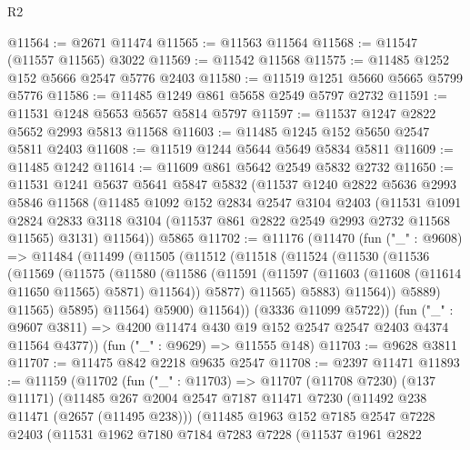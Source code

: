 \begin{lexlean}{R2}
\begin{coremodule}
@11564 := @2671 @11474
@11565 := @11563 @11564
@11568 := @11547 (@11557 @11565) @3022
@11569 := @11542 @11568
@11575 := @11485 @1252 @152 @5666 @2547 @5776 @2403
@11580 := @11519 @1251 @5660 @5665 @5799 @5776
@11586 := @11485 @1249 @861 @5658 @2549 @5797 @2732
@11591 := @11531 @1248 @5653 @5657 @5814 @5797
@11597 := @11537 @1247 @2822 @5652 @2993 @5813 @11568
@11603 := @11485 @1245 @152 @5650 @2547 @5811 @2403
@11608 := @11519 @1244 @5644 @5649 @5834 @5811
@11609 := @11485 @1242
@11614 := @11609 @861 @5642 @2549 @5832 @2732
@11650 := @11531
    @1241
    @5637
    @5641
    @5847
    @5832
    (@11537
      @1240
      @2822
      @5636
      @2993
      @5846
      @11568
      (@11485
        @1092
        @152
        @2834
        @2547
        @3104
        @2403
        (@11531
          @1091
          @2824
          @2833
          @3118
          @3104
          (@11537 @861 @2822 @2549 @2993 @2732 @11568 @11565)
          @3131)
        @11564))
    @5865
@11702 := @11176
    (@11470
      (fun ("_" : @9608) =>
      @11484
        (@11499
          (@11505
            (@11512
              (@11518
                (@11524
                  (@11530
                    (@11536
                      (@11569
                        (@11575
                          (@11580
                            (@11586
                              (@11591
                                (@11597 (@11603 (@11608 (@11614 @11650 @11565) @5871) @11564))
                                @5877)
                              @11565)
                            @5883)
                          @11564))
                      @5889)
                    @11565)
                  @5895)
                @11564)
              @5900)
            @11564))
        (@3336 @11099 @5722))
      (fun ("_" : @9607 @3811) => @4200 @11474 @430 @19 @152 @2547 @2547 @2403 @4374 @11564 @4377))
    (fun ("_" : @9629) => @11555 @148)
@11703 := @9628 @3811
@11707 := @11475 @842 @2218 @9635 @2547
@11708 := @2397 @11471
@11893 := @11159
    (@11702
      (fun ("_" : @11703) =>
      @11707
        (@11708 @7230)
        (@137 @11171)
        (@11485
          @267
          @2004
          @2547
          @7187
          @11471
          @7230
          (@11492 @238 @11471 (@2657 (@11495 @238)))
          (@11485
            @1963
            @152
            @7185
            @2547
            @7228
            @2403
            (@11531
              @1962
              @7180
              @7184
              @7283
              @7228
              (@11537
                @1961
                @2822

\end{coremodule}
\end{lexlean}
